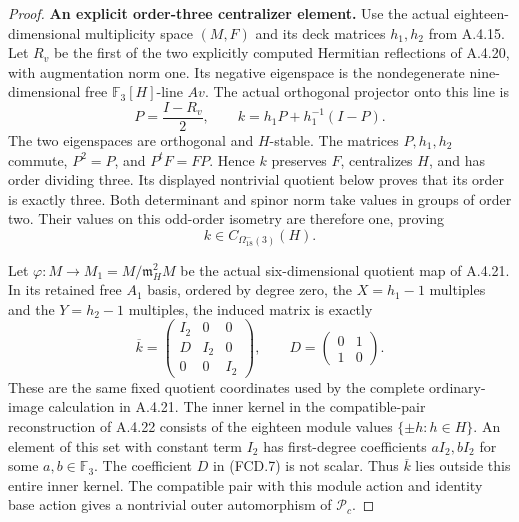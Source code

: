 \begin{proof}
\par\medskip\noindent\textbf{An explicit order-three centralizer element.}\quad
Use the actual eighteen-dimensional multiplicity space
$(M,F)$ and its deck matrices $h_1,h_2$ from A.4.15.
Let $R_v$ be the first of the two explicitly computed
Hermitian reflections of A.4.20, with augmentation norm
one.  Its negative eigenspace is the nondegenerate
nine-dimensional free $\mathbb F_3[H]$-line $Av$.
The actual orthogonal projector onto this line is
\[
          P=\frac{I-R_v}{2},\qquad
          k=h_1P+h_1^{-1}(I-P).
                                                               \tag{FCD.5}
\]
The two eigenspaces are orthogonal and $H$-stable.
The matrices $P,h_1,h_2$ commute, $P^2=P$, and
$P^tF=FP$.  Hence $k$ preserves $F$, centralizes $H$,
and has order dividing three.  Its displayed nontrivial
quotient below proves that its order is exactly three.
Both determinant and spinor norm take values in groups
of order two.  Their values on this odd-order isometry
are therefore one, proving
\[
                    k\in C_{\Omega_{18}^-(3)}(H).
                                                               \tag{FCD.6}
\]

Let $\varphi:M\to M_1=M/\mathfrak m_H^2M$ be the
actual six-dimensional quotient map of A.4.21.  In its
retained free $A_1$ basis, ordered by degree zero,
the $X=h_1-1$ multiples and the $Y=h_2-1$ multiples,
the induced matrix is exactly
\[
 \overline k=
 \begin{pmatrix}
  I_2&0&0\\
  D&I_2&0\\
  0&0&I_2
 \end{pmatrix},
 \qquad D=\begin{pmatrix}0&1\\1&0\end{pmatrix}.
                                                               \tag{FCD.7}
\]
These are the same fixed quotient coordinates used by
the complete ordinary-image calculation in A.4.21.
The inner kernel in the compatible-pair reconstruction
of A.4.22 consists of the eighteen module values
$\{\pm h:h\in H\}$.
An element of this set with constant term $I_2$ has
first-degree coefficients $aI_2,bI_2$ for some
$a,b\in\mathbb F_3$.  The coefficient $D$ in (FCD.7)
is not scalar.  Thus $\overline k$ lies outside this
entire inner kernel.  The compatible pair with this
module action and identity base action gives a
nontrivial outer automorphism of $\mathcal P_c$.


\end{proof}
